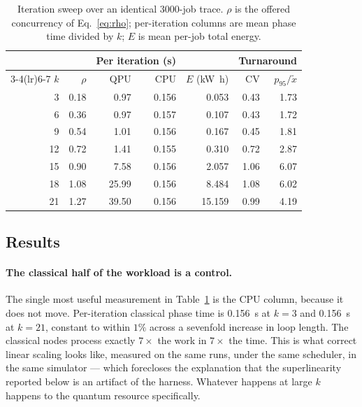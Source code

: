 \begin{table}[t]
\centering
\caption{Iteration sweep over an identical $3000$-job trace. $\rho$ is the
offered concurrency of Eq.~\eqref{eq:rho}; per-iteration columns are mean phase
time divided by $k$; $E$ is mean per-job total energy.}
\label{tab:iteration-sweep}
\small
\setlength{\tabcolsep}{4.5pt}
\begin{tabular}{@{}rrrrrrr@{}}
\toprule
 & & \multicolumn{2}{c}{Per iteration (\unit{\second})}
 & & \multicolumn{2}{c}{Turnaround} \\
\cmidrule(lr){3-4}\cmidrule(lr){6-7}
$k$ & $\rho$ & QPU & CPU & $E$ (\unit{\kilo\watt\hour})
 & CV & $p_{95}/\tilde{x}$ \\
\midrule
 3 & 0.18 &  0.97 & 0.156 &  0.053 & 0.43 & 1.73 \\
 6 & 0.36 &  0.97 & 0.157 &  0.107 & 0.43 & 1.72 \\
 9 & 0.54 &  1.01 & 0.156 &  0.167 & 0.45 & 1.81 \\
\midrule
12 & 0.72 &  1.41 & 0.155 &  0.310 & 0.72 & 2.87 \\
15 & 0.90 &  7.58 & 0.156 &  2.057 & 1.06 & 6.07 \\
18 & 1.08 & 25.99 & 0.156 &  8.484 & 1.08 & 6.02 \\
21 & 1.27 & 39.50 & 0.156 & 15.159 & 0.99 & 4.19 \\
\bottomrule
\end{tabular}
\end{table}

\subsection{Results}
\label{sec:iter-results}

\paragraph{The classical half of the workload is a control.}
The single most useful measurement in Table~\ref{tab:iteration-sweep} is the
CPU column, because it does not move. Per-iteration classical phase time is
\qty{0.156}{\second} at $k=3$ and \qty{0.156}{\second} at $k=21$, constant to
within $1\%$ across a sevenfold increase in loop length. The classical nodes
process exactly $7\times$ the work in $7\times$ the time. This is what
correct linear scaling looks like, measured on the same runs, under the same
scheduler, in the same simulator --- which forecloses the explanation that the
superlinearity reported below is an artifact of the harness. Whatever happens
at large $k$ happens to the quantum resource specifically.

